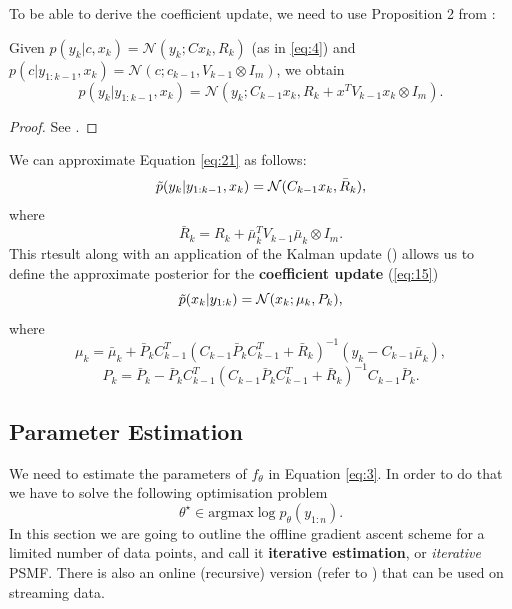 \documentclass{mldsmsc}
\begin{document}
\noindent To be able to derive the coefficient update, we need to use Proposition 2 from \cite{akyildiz2021probabilistic}:
\begin{proposition}
    Given $p(y_k | c, x_k) = \mathcal{N}(y_k; Cx_k, R_k)$ (as in \ref{eq:4}) and $p(c | y_{1:k-1}, x_k) = \mathcal{N}(c; c_{k-1}, V_{k-1} \otimes I_m)$, we obtain
    \begin{equation}\label{eq:21}
        p(y_k | y_{1:k-1}, x_k) = \mathcal{N}(y_k; C_{k-1} x_k, R_k + x^T V_{k-1} x_k \otimes I_m).
    \end{equation}
\end{proposition}
\begin{proof}
    See \cite{akyildiz2021probabilistic}.
\end{proof}\newline

\noindent We can approximate Equation \ref{eq:21} as follows:
\begin{equation}
    \Tilde{p}(y_k | y_{1:k-1}, x_k) = \mathcal{N}(C_{k-1} x_k, \bar{R}_k),
\end{equation}
where
\begin{equation}
    \bar{R}_k = R_k + \bar{\mu}_k^T V_{k-1} \bar{\mu}_k \otimes I_m.
\end{equation}
This rtesult along with an application of the Kalman update (\cite{anderson1979optimal}) allows us to define the approximate posterior for the \textbf{coefficient update} (\ref{eq:15})
\begin{equation}
    \Tilde{p}(x_k | y_{1:k}) = \mathcal{N}(x_k; \mu_k, P_k),
\end{equation}
where 
\begin{equation}
    \mu_k = \bar{\mu}_k +  \bar{P}_k C_{k-1}^T \left(C_{k-1} \bar{P}_k C_{k-1}^T + \bar{R}_k\right)^{-1} (y_k - C_{k-1} \bar{\mu}_k),
\end{equation}
\begin{equation} \label{eq:6}
    P_k = \bar{P}_k - \bar{P}_k C_{k-1}^T \left(C_{k-1} \bar{P}_k C_{k-1}^T + \bar{R}_k\right)^{-1} C_{k-1} \bar{P}_k.
\end{equation}

\subsection{Parameter Estimation}

We need to estimate the parameters of $f_{\theta}$ in Equation \ref{eq:3}. In order to do that we have to solve the following optimisation problem
\begin{equation}
    \theta^{\star} \in \text{argmax} \log p_{\theta}(y_{1:n}).
\end{equation}
In this section we are going to outline the offline gradient ascent scheme for a limited number of data points, and call it \textbf{iterative estimation}, or \textit{iterative} PSMF. There is also an online (recursive) version (refer to \cite{akyildiz2021probabilistic}) that can be used on streaming data. \newline
\end{document}
